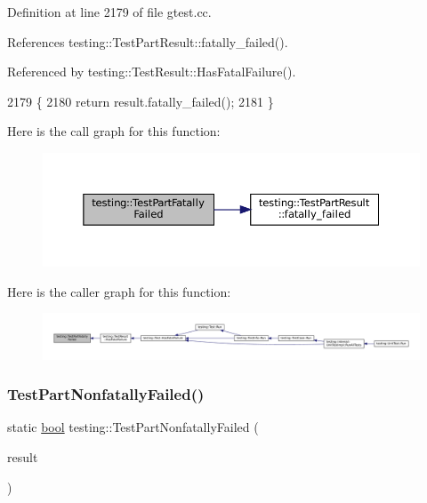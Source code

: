 Definition at line 2179 of file gtest.\+cc.



References testing\+::\+Test\+Part\+Result\+::fatally\+\_\+failed().



Referenced by testing\+::\+Test\+Result\+::\+Has\+Fatal\+Failure().


\begin{DoxyCode}
2179                                                                 \{
2180   \textcolor{keywordflow}{return} result.fatally\_failed();
2181 \}
\end{DoxyCode}
Here is the call graph for this function\+:
\nopagebreak
\begin{figure}[H]
\begin{center}
\leavevmode
\includegraphics[width=350pt]{namespacetesting_a9f19442d566c7eaec0702b9fcf282b63_cgraph}
\end{center}
\end{figure}
Here is the caller graph for this function\+:
\nopagebreak
\begin{figure}[H]
\begin{center}
\leavevmode
\includegraphics[width=350pt]{namespacetesting_a9f19442d566c7eaec0702b9fcf282b63_icgraph}
\end{center}
\end{figure}
\mbox{\label{namespacetesting_af256d104ca665115eb291f762bb659e3}} 
\subsubsection{\texorpdfstring{Test\+Part\+Nonfatally\+Failed()}{TestPartNonfatallyFailed()}}
{\footnotesize\ttfamily static \hyperlink{classbool}{bool} testing\+::\+Test\+Part\+Nonfatally\+Failed (\begin{DoxyParamCaption}\item[{const \hyperlink{classtesting_1_1TestPartResult}{Test\+Part\+Result} \&}]{result }\end{DoxyParamCaption})\hspace{0.3cm}{\ttfamily [static]}}



